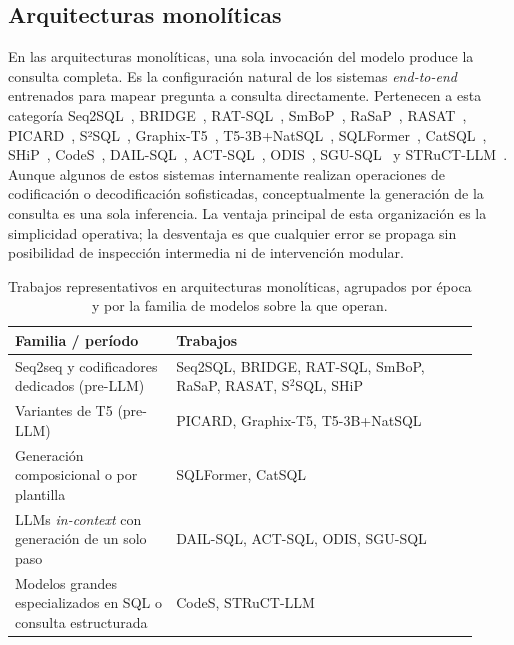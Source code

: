 \subsection{Arquitecturas monolíticas}
\label{subsec:sota-d2-monoliticas}

En las arquitecturas monolíticas, una sola invocación del modelo produce
la consulta completa. Es la configuración natural de los sistemas
\emph{end-to-end} entrenados para mapear pregunta a consulta directamente.
Pertenecen a esta categoría Seq2SQL~\cite{Seq2SQL2017},
BRIDGE~\cite{BRIDGE2020}, RAT-SQL~\cite{RAT-SQL2021},
SmBoP~\cite{SmBoP2021}, RaSaP~\cite{RaSaP2021}, RASAT~\cite{RASAT2022},
PICARD~\cite{PICARD2022}, S²SQL~\cite{S2SQL2022},
Graphix-T5~\cite{Graphix-T52022}, T5-3B+NatSQL~\cite{T5-3B+NatSQL+TokenPreprocessing2023},
SQLFormer~\cite{SQLFormer2023}, CatSQL~\cite{CatSQL2023},
SHiP~\cite{SHiP2022}, CodeS~\cite{CodeS2024},
DAIL-SQL~\cite{DAIL-SQL2023}, ACT-SQL~\cite{ACT-SQL2023},
ODIS~\cite{ODIS2023}, SGU-SQL~\cite{SGU-SQL2025} y
STRuCT-LLM~\cite{STRuCT-LLM2025}. Aunque algunos de estos sistemas
internamente realizan operaciones de codificación o decodificación
sofisticadas, conceptualmente la generación de la consulta es una sola
inferencia. La ventaja principal de esta organización es la simplicidad
operativa; la desventaja es que cualquier error se propaga sin posibilidad
de inspección intermedia ni de intervención modular.

\begin{table}[!htbp]
\centering
\footnotesize
\caption{Trabajos representativos en arquitecturas monolíticas, agrupados por época y por la familia de modelos sobre la que operan.}
\label{tab:sota-d2-monoliticas}
\begin{tabular}{@{}p{0.32\linewidth}p{0.60\linewidth}@{}}
\toprule
\textbf{Familia / período} & \textbf{Trabajos} \\
\midrule
Seq2seq y codificadores dedicados (pre-LLM) & Seq2SQL, BRIDGE, RAT-SQL, SmBoP, RaSaP, RASAT, S$^{2}$SQL, SHiP \\
Variantes de T5 (pre-LLM) & PICARD, Graphix-T5, T5-3B+NatSQL \\
Generación composicional o por plantilla & SQLFormer, CatSQL \\
\acp{LLM} \emph{in-context} con generación de un solo paso & DAIL-SQL, ACT-SQL, ODIS, SGU-SQL \\
Modelos grandes especializados en SQL o consulta estructurada & CodeS, STRuCT-LLM \\
\bottomrule
\end{tabular}
\end{table}


